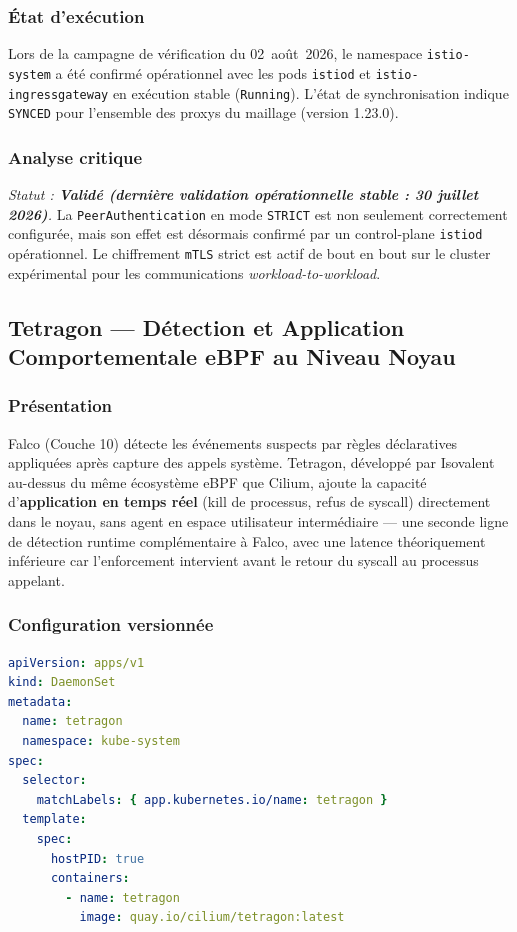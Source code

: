 \subsubsection{État d'exécution}
Lors de la campagne de vérification du 02~août~2026, le namespace \texttt{istio-system} a été confirmé opérationnel avec les pods \texttt{istiod} et \texttt{istio-ingressgateway} en exécution stable (\texttt{Running}). L'état de synchronisation indique \texttt{SYNCED} pour l'ensemble des proxys du maillage (version 1.23.0).

\subsubsection{Analyse critique}
\textit{Statut : \textbf{Validé (dernière validation opérationnelle stable : 30 juillet 2026)}.} La \texttt{PeerAuthentication} en mode \texttt{STRICT} est non seulement correctement configurée, mais son effet est désormais confirmé par un control-plane \texttt{istiod} opérationnel. Le chiffrement \texttt{mTLS} strict est actif de bout en bout sur le cluster expérimental pour les communications \textit{workload-to-workload}.

\subsection{Tetragon — Détection et Application Comportementale eBPF au Niveau Noyau}
\label{subsec:tetragon_complet_v2}

\subsubsection{Présentation}
Falco (Couche 10) détecte les événements suspects par règles déclaratives appliquées après capture des appels système. Tetragon, développé par Isovalent au-dessus du même écosystème eBPF que Cilium, ajoute la capacité d'\textbf{application en temps réel} (kill de processus, refus de syscall) directement dans le noyau, sans agent en espace utilisateur intermédiaire — une seconde ligne de détection runtime complémentaire à Falco, avec une latence théoriquement inférieure car l'enforcement intervient avant le retour du syscall au processus appelant.

\subsubsection{Configuration versionnée}
\begin{lstlisting}[language=yaml, caption={Extrait réel du DaemonSet Tetragon (\texttt{infra/k8s/tetragon/daemonset.yaml})}, label={lst:tetragon_daemonset_reel}]
apiVersion: apps/v1
kind: DaemonSet
metadata:
  name: tetragon
  namespace: kube-system
spec:
  selector:
    matchLabels: { app.kubernetes.io/name: tetragon }
  template:
    spec:
      hostPID: true
      containers:
        - name: tetragon
          image: quay.io/cilium/tetragon:latest
\end{lstlisting}

